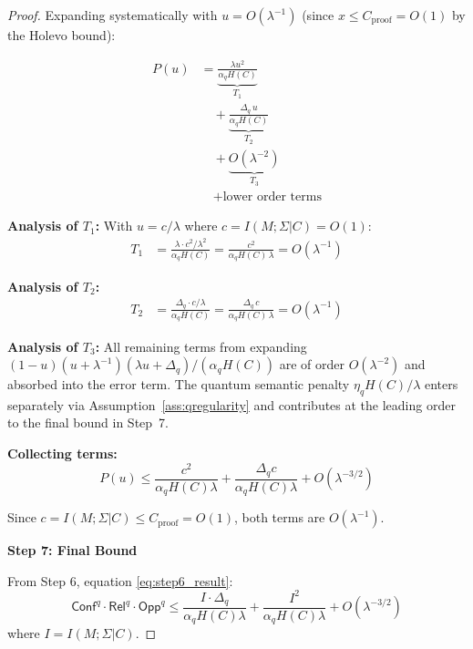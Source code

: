 \documentclass{ieeeaccess}
\newcommand{\Conf}{\mathsf{Conf}}
\newcommand{\Rel}{\mathsf{Rel}}
\newcommand{\Opp}{\mathsf{Opp}}
\begin{document}
\begin{proof}
Expanding systematically with $u = O(\lambda^{-1})$ (since $x \leq C_{\mathrm{proof}} = O(1)$ by the Holevo bound):

\begin{align}
    P(u) &= \underbrace{\frac{\lambda u^2}{\alpha_q H(C)}}_{T_1} \\
    &\quad + \underbrace{\frac{\Delta_q \, u}{\alpha_q H(C)}}_{T_2} \\
    &\quad + \underbrace{O(\lambda^{-2})}_{T_3} \\
    &\quad + \text{lower order terms}
\end{align}

\textbf{Analysis of $T_1$:}
With $u = c/\lambda$ where $c = I(M;\Sigma|C) = O(1)$:
\begin{align}
    T_1 &= \frac{\lambda \cdot c^2/\lambda^2}{\alpha_q H(C)} 
         = \frac{c^2}{\alpha_q H(C)\,\lambda} = O(\lambda^{-1})
\end{align}

\textbf{Analysis of $T_2$:}
\begin{align}
    T_2 &= \frac{\Delta_q \cdot c/\lambda}{\alpha_q H(C)} 
         = \frac{\Delta_q\, c}{\alpha_q H(C)\,\lambda} = O(\lambda^{-1})
\end{align}

\textbf{Analysis of $T_3$:}
All remaining terms from expanding 
$(1-u)(u + \lambda^{-1})(\lambda u + \Delta_q)/(\alpha_q H(C))$ 
are of order $O(\lambda^{-2})$ and absorbed into the error term.
The quantum semantic penalty $\eta_q H(C)/\lambda$ enters separately 
via Assumption~\ref{ass:qregularity} and contributes at the leading order 
to the final bound in Step~7.

\textbf{Collecting terms:}
\begin{equation}
\label{eq:step6_result}
    P(u) \leq \frac{c^2}{\alpha_q H(C) \lambda} + \frac{\Delta_q c}{\alpha_q H(C) \lambda} + O(\lambda^{-3/2})
\end{equation}

Since $c = I(M;\Sigma|C) \leq C_{\mathrm{proof}} = O(1)$, both terms are $O(\lambda^{-1})$.

\textbf{Step 7: Final Bound}

From Step 6, equation \eqref{eq:step6_result}:
\begin{equation}
    \Conf^q \cdot \Rel^q \cdot \Opp^q \leq \frac{I \cdot \Delta_q}{\alpha_q H(C) \lambda} + \frac{I^2}{\alpha_q H(C) \lambda} + O(\lambda^{-3/2})
\end{equation}
where $I = I(M;\Sigma|C)$.


\end{proof}
\end{document}
